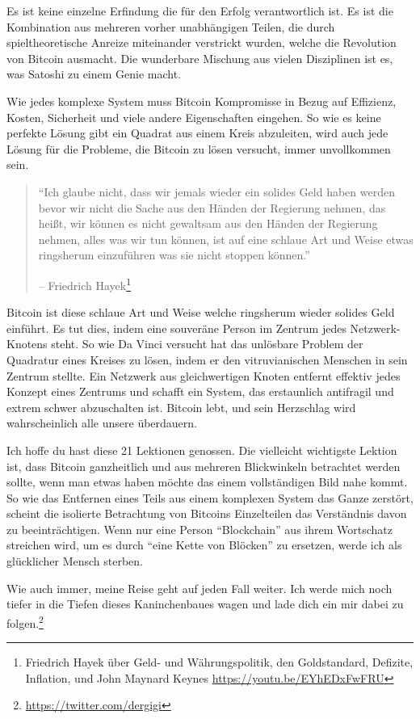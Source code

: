 Es ist keine einzelne Erfindung die für den Erfolg verantwortlich ist. Es ist
die Kombination aus mehreren vorher unabhängigen Teilen, die durch
spieltheoretische Anreize miteinander verstrickt wurden, welche die Revolution
von Bitcoin ausmacht. Die wunderbare Mischung aus vielen Disziplinen ist es, was
Satoshi zu einem Genie macht.

Wie jedes komplexe System muss Bitcoin Kompromisse in Bezug auf
Effizienz, Kosten, Sicherheit und viele andere Eigenschaften eingehen. So wie es
keine perfekte Lösung gibt ein Quadrat aus einem Kreis abzuleiten, wird auch
jede Lösung für die Probleme, die Bitcoin zu lösen versucht, immer unvollkommen
sein.

\begin{quotation}\begin{samepage}
\enquote{Ich glaube nicht, dass wir jemals wieder ein solides Geld haben werden
bevor wir nicht die Sache aus den Händen der Regierung nehmen, das heißt, wir
können es nicht gewaltsam aus den Händen der Regierung nehmen, alles was wir tun
können, ist auf eine schlaue Art und Weise etwas ringsherum einzuführen was sie
nicht stoppen können.}
\begin{flushright} -- Friedrich Hayek\footnote{Friedrich Hayek über Geld- und
Währungspolitik, den Goldstandard, Defizite, Inflation, und John Maynard Keynes
\url{https://youtu.be/EYhEDxFwFRU}}
\end{flushright}\end{samepage}\end{quotation}

Bitcoin ist diese schlaue Art und Weise welche ringsherum wieder solides Geld
einführt. Es tut dies, indem eine souveräne Person im Zentrum jedes Netzwerk-Knotens steht.
So wie Da Vinci versucht hat das unlösbare Problem der Quadratur eines Kreises
zu lösen, indem er den vitruvianischen Menschen in sein Zentrum stellte. Ein
Netzwerk aus gleichwertigen Knoten entfernt effektiv jedes Konzept eines Zentrums
und schafft ein System, das erstaunlich antifragil und extrem schwer abzuschalten
ist. Bitcoin lebt, und sein Herzschlag wird wahrscheinlich alle unsere
überdauern.

Ich hoffe du hast diese 21 Lektionen genossen. Die vielleicht wichtigste Lektion
ist, dass Bitcoin ganzheitlich und aus mehreren Blickwinkeln betrachtet werden
sollte, wenn man etwas haben möchte das einem vollständigen Bild nahe kommt. So
wie das Entfernen eines Teils aus einem komplexen System das Ganze zerstört,
scheint die isolierte Betrachtung von Bitcoins Einzelteilen das Verständnis
davon zu beeinträchtigen. Wenn nur eine Person \enquote{Blockchain} aus ihrem
Wortschatz streichen wird, um es durch \enquote{eine Kette von Blöcken} zu
ersetzen, werde ich als glücklicher Mensch sterben.

Wie auch immer, meine Reise geht auf jeden Fall weiter. Ich werde mich noch
tiefer in die Tiefen dieses Kaninchenbaues wagen und lade dich ein mir dabei zu
folgen.\footnote{\url{https://twitter.com/dergigi}}

%
